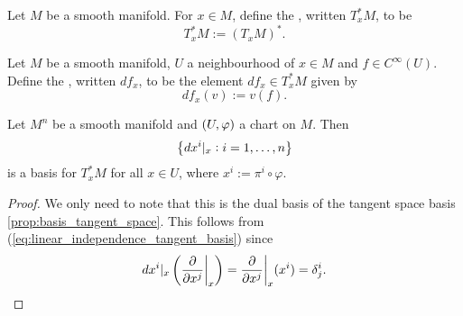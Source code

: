 \begin{definition}
	Let $M$ be a smooth manifold. For $x \in M$, define the , written $T^*_xM$, to be 
	\begin{equation*}
		T^*_xM := (T_xM)^*.
	\end{equation*}
\end{definition}

\begin{definition}[Differential]
	Let $M$ be a smooth manifold, $U$ a neighbourhood of $x \in M$ and $f \in C^\infty(U)$. Define the , written $df_x$, to be the element $df_x \in T^*_xM$ given by
	\begin{equation*}
		df_x(v) := v(f).
	\end{equation*}
\end{definition}

\begin{lemma}
	\label{lem:basis_cotangent_space}
	Let $M^n$ be a smooth manifold and $\del[0]{U,\varphi}$ a chart on $M$. Then 
	\begin{equation*}
		\cbr[1]{dx^i\vert_x : i = 1,\dots,n}
	\end{equation*}
	\noindent is a basis for $T^*_xM$ for all $x \in U$, where $x^i := \pi^i \circ \varphi$.
\end{lemma}

\begin{proof}
	We only need to note that this is the dual basis of the tangent space basis \ref{prop:basis_tangent_space}. This follows from (\ref{eq:linear_independence_tangent_basis}) since
	\begin{equation*}
		dx^i\vert_x\del[3]{\frac{\partial}{\partial x^j}\bigg\vert_x} = \frac{\partial}{\partial x^j}\bigg\vert_x(x^i) = \delta^i_j.
	\end{equation*}
\end{proof}
